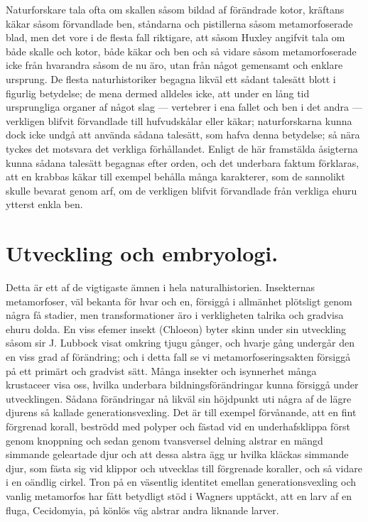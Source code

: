 Naturforskare tala ofta om skallen såsom bildad af förändrade kotor, kräftans käkar såsom förvandlade ben, ståndarna och pistillerna såsom metamorfoserade blad, men det vore i de flesta fall riktigare, att såsom Huxley angifvit tala om både skalle och kotor, både käkar och ben och så vidare såsom metamorfoserade icke från hvarandra såsom de nu äro, utan från något gemensamt och enklare ursprung. De flesta naturhistoriker begagna likväl ett sådant talesätt blott i figurlig betydelse; de mena dermed alldeles icke, att under en lång tid ursprungliga organer af något slag — vertebrer i ena fallet och ben i det andra — verkligen blifvit förvandlade till hufvudskålar eller käkar; naturforskarna kunna dock icke undgå att använda sådana talesätt, som hafva denna betydelse; så nära tyckes det motsvara det verkliga förhållandet. Enligt de här framstälda åsigterna kunna sådana talesätt begagnas efter orden, och det underbara faktum förklaras, att en krabbas käkar till exempel behålla många karakterer, som de sannolikt skulle bevarat genom arf, om de verkligen blifvit förvandlade från verkliga ehuru ytterst enkla ben.



\section{Utveckling och embryologi.}

Detta är ett af de vigtigaste ämnen i hela naturalhistorien. Insekternas metamorfoser, väl bekanta för hvar och en, försiggå i allmänhet plötsligt genom några få stadier, men transformationer äro i verkligheten talrika och gradvisa ehuru dolda. En viss efemer insekt (Chloeon) byter skinn under sin utveckling såsom sir J. Lubbock visat omkring tjugu gånger, och hvarje gång undergår den en viss grad af förändring; och i detta fall se vi metamorfoseringsakten försiggå på ett primärt och gradvist sätt. Många insekter och isynnerhet många krustaceer visa oss, hvilka underbara bildningsförändringar kunna försiggå under utvecklingen. Sådana förändringar nå likväl sin höjdpunkt uti några af de lägre djurens så kallade generationsvexling. Det är till exempel förvånande, att en fint förgrenad korall, beströdd med polyper och fästad vid en underhafsklippa först genom knoppning och sedan genom tvansversel delning alstrar en mängd simmande geleartade djur och att dessa alstra ägg ur hvilka kläckas simmande djur, som fästa sig vid klippor och utvecklas till förgrenade koraller, och så vidare i en oändlig cirkel. Tron på en väsentlig identitet emellan generationsvexling och vanlig metamorfos har fått betydligt stöd i Wagners upptäckt, att en larv af en fluga, Cecidomyia, på könlös väg alstrar andra liknande larver.

